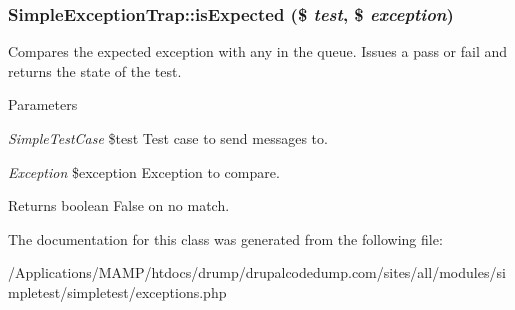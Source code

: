 \hypertarget{class_simple_exception_trap_a78f097e944e00ef30267744fa28508e4}{
\subsubsection[{isExpected}]{\setlength{\rightskip}{0pt plus 5cm}SimpleExceptionTrap::isExpected (\$ {\em test}, \/  \$ {\em exception})}}
\label{class_simple_exception_trap_a78f097e944e00ef30267744fa28508e4}
Compares the expected exception with any in the queue. Issues a pass or fail and returns the state of the test. 
\begin{DoxyParams}{Parameters}
\item[{\em SimpleTestCase}]\$test Test case to send messages to. \item[{\em Exception}]\$exception Exception to compare. \end{DoxyParams}
\begin{DoxyReturn}{Returns}
boolean False on no match. 
\end{DoxyReturn}


The documentation for this class was generated from the following file:\begin{DoxyCompactItemize}
\item 
/Applications/MAMP/htdocs/drump/drupalcodedump.com/sites/all/modules/simpletest/simpletest/exceptions.php\end{DoxyCompactItemize}
